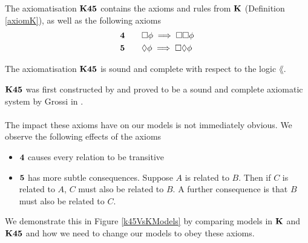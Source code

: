 \begin{lemma} \label{axiomK45}
The axiomatisation $\bf K45$ contains the axioms and rules from $\bf K$ (Definition
    \ref{axiomK}), as well as the following axioms
\begin{alignat*}{2}
  & \bf 4 && \quad \Box \phi \implies \Box \Box \phi \\
  & \bf 5 && \quad \Diamond \phi \implies \Box \Diamond \phi
\end{alignat*}
\end{lemma}

\begin{lemma} \label{axiomK45SoundComplete}
The axiomatisation $\bf K45$ is sound and complete with respect to the logic
$\lang$.
\end{lemma}

$\bf K45$ was first constructed by \FIXME and proved to be a sound and complete axiomatic
system by Grossi in \cite{grossi2007designing}.\\
\\
The impact these axioms have on our models is not immediately obvious.
We observe the following effects of the axioms
\begin{itemize}
	\item $\bf 4$ causes every relation to be transitive
	\item $\bf 5$ has more subtle consequences.
    Suppose $A$ is related to $B$.
    Then if $C$ is related to $A$, $C$ must also be related to $B$.
    A further consequence is that $B$ must also be related to $C$.
\end{itemize}

We demonstrate this in Figure \ref{k45VsKModels} by comparing models in $\bf K$ and $\bf K45$ and how we need to change
our models to obey these axioms.

